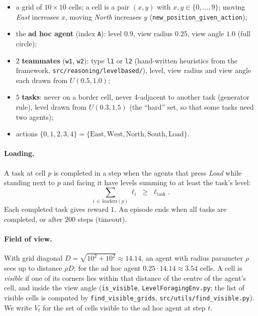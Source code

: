 \documentclass[11pt,a4paper]{article}
\newcommand{\file}{\nolinkurl}  %
\newcommand{\code}[1]{\texttt{#1}}
\theoremstyle{remark}
\begin{document}
\begin{itemize}[nosep]
  \item a grid of $10\times 10$ cells; a cell is a pair $(x,y)$ with $x,y\in\{0,\dots,9\}$; moving \emph{East} increases
        $x$, moving \emph{North} increases $y$ (\code{new\_position\_given\_action});
  \item the \textbf{ad hoc agent} (index \code{A}): level $0.9$, view radius $0.25$, view angle $1.0$ (full circle);
  \item $2$ \textbf{teammates} (\code{w1}, \code{w2}): type \code{l1} or \code{l2} (hand-written heuristics from the
        framework, \file{src/reasoning/levelbased/}), level, view radius and view angle each drawn from $U(0.5,1.0)$;
  \item $5$ \textbf{tasks}: never on a border cell, never 4-adjacent to another task (generator rule), level drawn from
        $U(0.3,1.5)$ (the ``hard'' set, so that some tasks need two agents);
  \item actions $\{0,1,2,3,4\} = \{\text{East},\text{West},\text{North},\text{South},\text{Load}\}$.
\end{itemize}

\paragraph{Loading.} A task at cell $p$ is completed in a step when the agents that press \emph{Load} while standing next
to $p$ and facing it have levels summing to at least the task's level:
\begin{equation}
  \sum_{i\,\in\,\text{loaders}(p)} \ell_i \;\ge\; \ell_{\text{task}} .
  \label{eq:load}
\end{equation}
Each completed task gives reward $1$. An episode ends when all tasks are completed, or after $200$ steps (timeout).

\paragraph{Field of view.} With grid diagonal $D=\sqrt{10^2+10^2}\approx 14.14$, an agent with radius parameter $\rho$
sees up to distance $\rho D$; for the ad hoc agent $0.25\cdot 14.14 \approx 3.54$ cells. A cell is \emph{visible} if one
of its corners lies within that distance of the centre of the agent's cell, and inside the view angle
(\code{is\_visible}, \file{LevelForagingEnv.py}; the list of visible cells is computed by \code{find\_visible\_grids},
\file{src/utils/find_visible.py}). We write $V_t$ for the set of cells visible to the ad hoc agent at step $t$.
\end{document}
